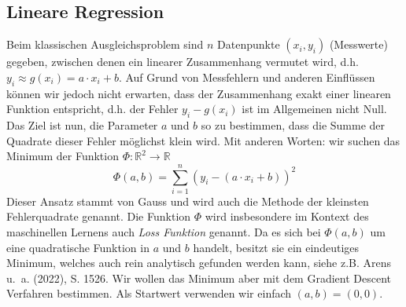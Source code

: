 \documentclass[
  a4paper,
  DIV=11]{scrreprt}
\theoremstyle{definition}
\theoremstyle{definition}
\theoremstyle{remark}
\begin{document}
\hypertarget{lineare-regression}{%
\subsection{Lineare Regression}\label{lineare-regression}}

Beim klassischen Ausgleichsproblem sind \(n\) Datenpunkte
\((x_i , y_i)\) (Messwerte) gegeben, zwischen denen ein linearer
Zusammenhang vermutet wird, d.h.
\(y_i \approx g(x_i) = a\cdot x_i + b\). Auf Grund von Messfehlern und
anderen Einflüssen können wir jedoch nicht erwarten, dass der
Zusammenhang exakt einer linearen Funktion entspricht, d.h. der Fehler
\(y_i - g(x_i)\) ist im Allgemeinen nicht Null. Das Ziel ist nun, die
Parameter \(a\) und \(b\) so zu bestimmen, dass die Summe der Quadrate
dieser Fehler möglichst klein wird. Mit anderen Worten: wir suchen das
Minimum der Funktion \(\Phi : \mathbb{R}^2 \rightarrow \mathbb{R}\) \[
\Phi(a, b) = \sum_{i = 1}^n (y_i - (a\cdot x_i + b))^2
\] Dieser Ansatz stammt von Gauss und wird auch die Methode der
kleinsten Fehlerquadrate genannt. Die Funktion \(\Phi\) wird
insbesondere im Kontext des maschinellen Lernens auch \emph{Loss
Funktion} genannt. Da es sich bei \(\Phi(a,b)\) um eine quadratische
Funktion in \(a\) und \(b\) handelt, besitzt sie ein eindeutiges
Minimum, welches auch rein analytisch gefunden werden kann, siehe z.B.
Arens u.~a. (2022), S. 1526. Wir wollen das Minimum aber mit dem
Gradient Descent Verfahren bestimmen. Als Startwert verwenden wir
einfach \((a, b) = (0, 0)\).
\end{document}
